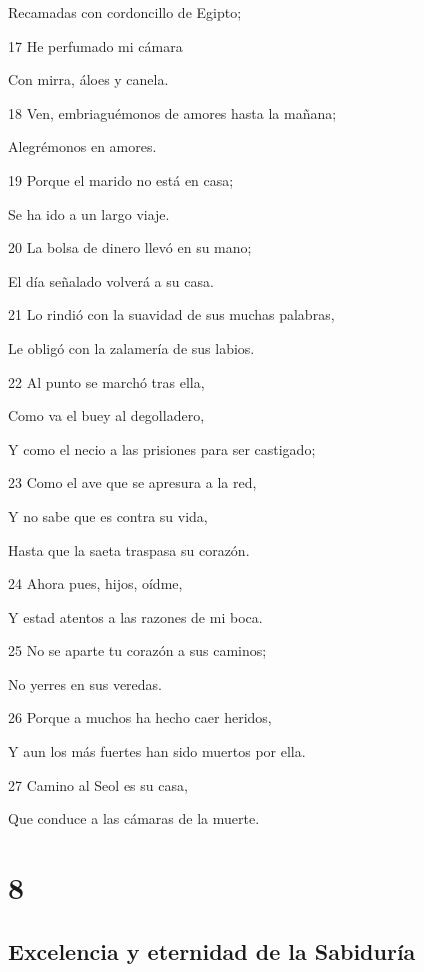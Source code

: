 \par Recamadas con cordoncillo de Egipto;
\par 17 He perfumado mi cámara
\par Con mirra, áloes y canela.
\par 18 Ven, embriaguémonos de amores hasta la mañana;
\par Alegrémonos en amores.
\par 19 Porque el marido no está en casa;
\par Se ha ido a un largo viaje.
\par 20 La bolsa de dinero llevó en su mano;
\par El día señalado volverá a su casa.
\par 21 Lo rindió con la suavidad de sus muchas palabras,
\par Le obligó con la zalamería de sus labios.
\par 22 Al punto se marchó tras ella,
\par Como va el buey al degolladero,
\par Y como el necio a las prisiones para ser castigado;
\par 23 Como el ave que se apresura a la red,
\par Y no sabe que es contra su vida,
\par Hasta que la saeta traspasa su corazón.
\par 24 Ahora pues, hijos, oídme,
\par Y estad atentos a las razones de mi boca.
\par 25 No se aparte tu corazón a sus caminos;
\par No yerres en sus veredas.
\par 26 Porque a muchos ha hecho caer heridos,
\par Y aun los más fuertes han sido muertos por ella.
\par 27 Camino al Seol es su casa,
\par Que conduce a las cámaras de la muerte.

\chapter{8}

\section*{Excelencia y eternidad de la Sabiduría}


